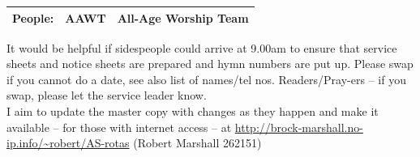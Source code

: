 \documentclass[10pt]{article}
\begin{document}
\begin{center}
\vspace{1em}
\begin{tabular}{|c|c|c|}\hline
{\bf People: } &
AAWT & All-Age Worship Team \\
     \hline
  \end{tabular}
\end{center}
\begin{minipage}{0.65\textwidth}
{\footnotesize It would be helpful if sidespeople 
could arrive at 9.00am to ensure that service sheets and notice sheets are 
prepared and hymn numbers are put up.
Please swap if you cannot do a date, see also list of names/tel nos.
Readers/Pray-ers -- if you swap, please let the service leader know.\\
I aim to update the master copy with changes as they
happen and make it available -- for those with internet access
\linebreak -- at
\url{http://brock-marshall.no-ip.info/~robert/AS-rotas}
(Robert Marshall 262151)}
\end{minipage}
\end{document}
